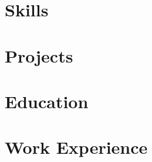 \documentclass[letter,10pt]{article}
\begin{document}


\section{Skills}


\section{Projects}


\section{Education}


\section{Work Experience}

\end{document}
